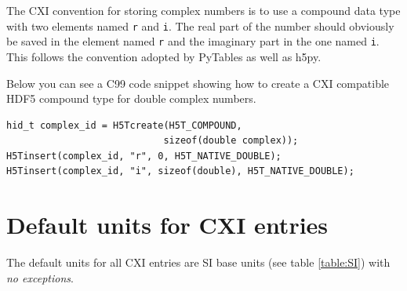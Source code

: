 \documentclass[usletter,11pt]{article}
\begin{document}
The CXI convention for storing complex numbers is to use a compound data
type with two elements named {\tt r} and {\tt i}. The real part of the
number should obviously be saved in the element named {\tt r} and the imaginary
part in the one named {\tt i}. This follows the convention adopted by
PyTables as well as h5py.

Below you can see a C99 code snippet showing how to create a CXI compatible HDF5
compound type for double complex numbers.

\begin{lstlisting}
hid_t complex_id = H5Tcreate(H5T_COMPOUND, 
                            sizeof(double complex));
H5Tinsert(complex_id, "r", 0, H5T_NATIVE_DOUBLE);
H5Tinsert(complex_id, "i", sizeof(double), H5T_NATIVE_DOUBLE);
\end{lstlisting}

\clearpage
\section{Default units for CXI entries}
\label{units}

The default units for all CXI entries are SI base units (see table
\ref{table:SI}) with {\em no exceptions}.
\end{document}
